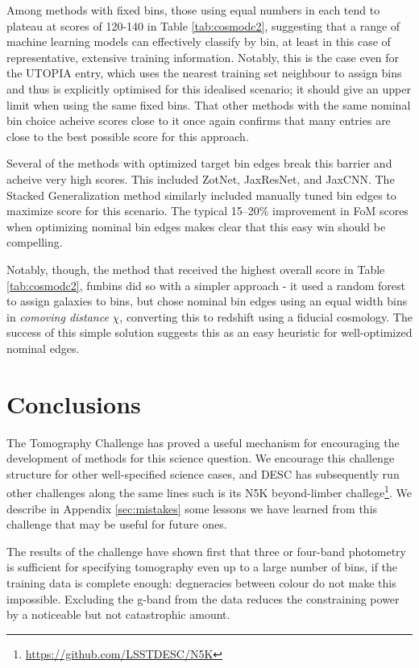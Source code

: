 \documentclass[twocolumn,twocolappendix]{aastex63}
\begin{document}
Among methods with fixed bins, those using equal numbers in each tend to plateau at scores of
120-140 in Table \ref{tab:cosmodc2}, suggesting that a range of machine learning models can
effectively classify by bin, at least in this case of representative, extensive training
information.  Notably, this is the case even for the UTOPIA entry, which uses the nearest 
training set neighbour to assign bins and thus is explicitly optimised
for this idealised scenario; it should give an upper limit when using the same fixed bins.
That other methods with the same nominal bin choice acheive scores close to it once again
confirms that many entries are close to the best possible score for this approach.


Several of the methods with optimized target bin edges break this
barrier and acheive very high scores.  This included ZotNet, JaxResNet, and JaxCNN.  The
Stacked Generalization method similarly included manually tuned bin edges to maximize
score for this scenario. The typical 15--20\% improvement in FoM scores when optimizing
nominal bin edges makes clear that this easy win should be compelling.

Notably, though, the method that received the highest overall score in Table \ref{tab:cosmodc2}, 
{\sc funbins} did so with a simpler approach - it used a random forest to assign galaxies to bins,
but chose nominal bin edges using an equal width bins in \emph{comoving distance} $\chi$, converting
this to redshift using a fiducial cosmology. The success of this simple solution suggests this
as an easy heuristic for well-optimized nominal edges.

\section{Conclusions} \label{sec:conclusion}
The Tomography Challenge has proved a useful mechanism for encouraging the development
of methods for this science question.  We encourage this challenge structure for other
well-specified science cases, and DESC has subsequently run other challenges along the same lines
such is its N5K beyond-limber challege\footnote{\url{https://github.com/LSSTDESC/N5K}}.
We describe in Appendix \ref{sec:mistakes} some lessons we have learned from this challenge
that may be useful for future ones.

The results of the challenge have shown first that three or four-band photometry
is sufficient for specifying tomography even up to a large number of bins, if
the training data is complete enough: degneracies between colour do not make this impossible.
Excluding the g-band from the data reduces the constraining power by a noticeable but
not catastrophic amount.
\end{document}
